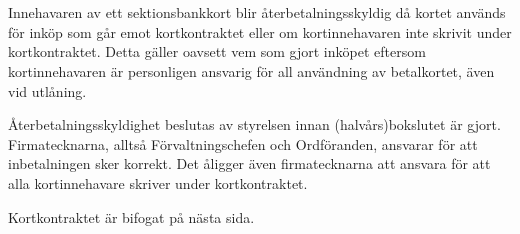 \documentclass[10pt]{article}
\begin{document}
    \section*{\doctitle}

    Innehavaren av ett sektionsbankkort blir återbetalningsskyldig då kortet används för inköp som går emot kortkontraktet eller om kortinnehavaren inte skrivit under kortkontraktet. Detta gäller oavsett vem som gjort inköpet eftersom kortinnehavaren är personligen ansvarig för all användning av betalkortet, även vid utlåning.

    Återbetalningsskyldighet beslutas av styrelsen innan (halvårs)bokslutet är gjort. Firmatecknarna, alltså Förvaltningschefen och Ordföranden, ansvarar för att inbetalningen sker korrekt. Det åligger även firmatecknarna att ansvara för att alla kortinnehavare skriver under kortkontraktet.

    Kortkontraktet är bifogat på nästa sida.

    
\end{document}
